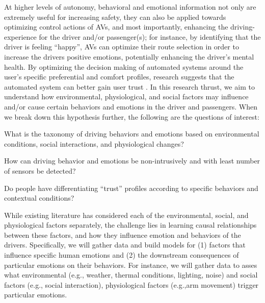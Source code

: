 At higher levels of autonomy, behavioral and emotional information not only are extremely useful for increasing safety, they can also be applied towards optimizing control actions of AVs, and most importantly, enhancing the  driving-experience for the driver and/or passenger(s); for instance, by identifying that the driver is feeling ``happy'', AVs can optimize their route selection in order to increase the drivers positive emotions, potentially enhancing the driver's mental health. 
By optimizing the decision making of automated systems around the user's specific preferential and comfort profiles, research suggests that the automated system can better gain user trust \cite{mouloua2018automation, noah2017first}. 
In this research thrust, we aim to understand how environmental, physiological, and social factors may influence and/or cause certain behaviors and emotions in the driver and passengers. 
When we break down this hypothesis further, the following are the questions of interest:
\begin{enumerate*}
    \item What is the taxonomy of driving behaviors and emotions based on environmental conditions, social interactions, and physiological changes?
    \item How can driving behavior and emotions be non-intrusively and with least number of sensors be detected?
    \item Do people have differentiating “trust” profiles according to specific behaviors and contextual conditions?  
\end{enumerate*}
While existing literature has considered each of the environmental, social, and physiological factors separately, the challenge lies in learning causal relationships between these factors, and how they influence emotion and behaviors of the drivers.  
Specifically, we will gather data and build models for (1) factors that influence specific human emotions and (2) the downstream consequences of particular emotions on their behaviors. 
For instance, we will gather data to asses what environmental (e.g., weather, thermal conditions, lighting, noise) and social factors (e.g., social interaction), physiological factors (e.g.,arm movement) trigger particular emotions.

